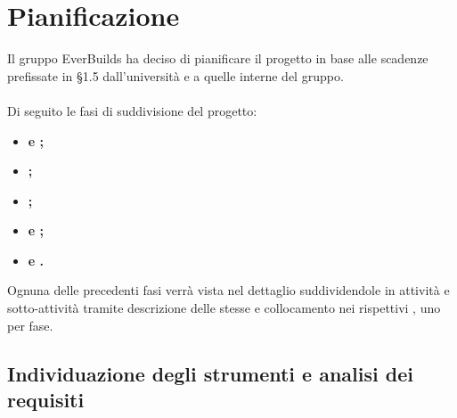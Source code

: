 \section{Pianificazione}
	
	Il gruppo EverBuilds ha deciso di pianificare il progetto in base alle scadenze prefissate in §1.5 dall'università e a quelle interne del gruppo.
	\\
	\\
	Di seguito le fasi di suddivisione del progetto:
	\begin{itemize}
		\item \textbf{ e ;}
		\item \textbf{;}
		\item \textbf{;}
		\item \textbf{ e ;}
		\item \textbf{ e .}
	\end{itemize}
	Ognuna delle precedenti fasi verrà vista nel dettaglio suddividendole in attività e sotto-attività tramite descrizione delle stesse e collocamento nei rispettivi , uno per fase.
	
\subsection{Individuazione degli strumenti e analisi dei requisiti}

